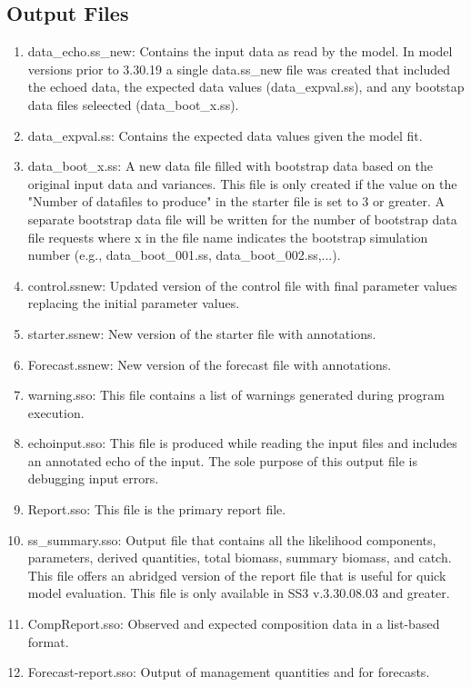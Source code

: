 	\subsection{Output Files}
	\begin{enumerate}
		\item data\_echo.ss\_new: Contains the input data as read by the model. In model versions prior to 3.30.19 a single data.ss\_new file was created that included the echoed data, the expected data values (data\_expval.ss), and any bootstap data files seleected (data\_boot\_x.ss).
		\item data\_expval.ss: Contains the expected data values given the model fit.
		\item data\_boot\_x.ss: A new data file filled with bootstrap data based on the original input data and variances. This file is only created if the value on the "Number of datafiles to produce" in the starter file is set to 3 or greater. A separate bootstrap data file will be written for the number of bootstrap data file requests where x in the file name indicates the bootstrap simulation number (e.g., data\_boot\_001.ss, data\_boot\_002.ss,...).
		\item control.ss\textunderscore new: Updated version of the control file with final parameter values replacing the initial parameter values.
		\item starter.ss\textunderscore new: New version of the starter file with annotations.
		\item Forecast.ss\textunderscore new: New version of the forecast file with annotations.
		\item warning.sso: This file contains a list of warnings generated during program execution.
		\item echoinput.sso: This file is produced while reading the input files and includes an annotated echo of the input. The sole purpose of this output file is debugging input errors.
		\item Report.sso: This file is the primary report file.
		\item ss\_summary.sso: Output file that contains all the likelihood components, parameters, derived quantities, total biomass, summary biomass, and catch. This file offers an abridged version of the report file that is useful for quick model evaluation. This file is only available in SS3 v.3.30.08.03 and greater.
		\item CompReport.sso: Observed and expected composition data in a list-based format.
		\item Forecast-report.sso: Output of management quantities and for forecasts.

\end{enumerate}
